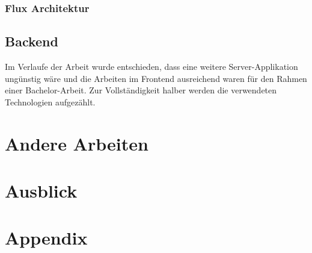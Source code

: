 \documentclass[12pt,twoside]{book}
\let\cleardoublepage\clearpage
\begin{document}
\subsection{Flux Architektur}


\section*{Backend}

Im Verlaufe der Arbeit wurde entschieden, dass eine weitere Server-Applikation ungünstig wäre und die Arbeiten im Frontend ausreichend waren für den Rahmen einer Bachelor-Arbeit.
Zur Vollständigkeit halber werden die verwendeten Technologien aufgezählt.

\chapter{Andere Arbeiten}


\chapter{Ausblick}

\chapter{Appendix}

\cleardoublepage
{}

\printbibliography

\cleardoublepage
{}
\end{document}
